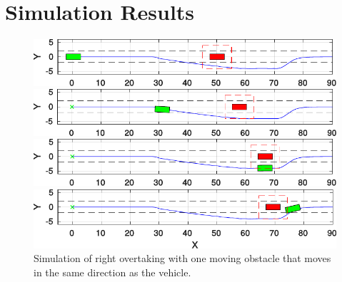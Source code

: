 \section{Simulation Results}
\begin{figure}[h!]
	\centering
	\begin{minipage}[t]{\textwidth}
		\includegraphics[width=\textwidth]{../figure/one_obstacle_right_overtaking/overtaking_start.pdf}
	\end{minipage}
	\begin{minipage}[t]{\textwidth}
		\includegraphics[width=\textwidth]{../figure/one_obstacle_right_overtaking/overtaking_middle.pdf}
	\end{minipage}
	\begin{minipage}[t]{\textwidth}
		\includegraphics[width=\textwidth]{../figure/one_obstacle_right_overtaking/overtaking_middle_end.pdf}
	\end{minipage}
	\begin{minipage}[t]{\textwidth}
		\includegraphics[width=\textwidth]{../figure/one_obstacle_right_overtaking/overtaking_end.pdf}
	\end{minipage}
	\caption{Simulation of right overtaking with one moving obstacle that moves in the same direction as the vehicle.}
	\label{fig:obstacleAvoidance_one_obstacle}
\end{figure}
